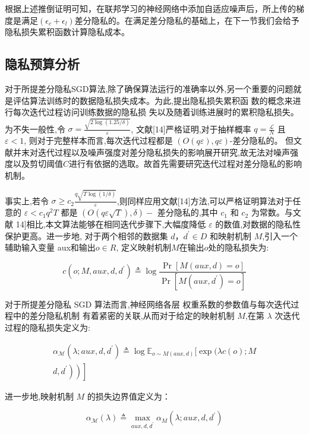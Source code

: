 根据上述推倒证明可知，在联邦学习的神经网络中添加自适应噪声后，所上传的梯度是满足$\left(\epsilon_{c}+\epsilon_{l}\right)$差分隐私的。在满足差分隐私的基础上，在下一节我们会给予隐私损失累积函数计算隐私成本。

\subsection{隐私预算分析}
对于所提差分隐私SGD算法,除了确保算法运行的准确率以外,另一个重要的问题就是评估算法训练时的数据隐私损失成本。为此,提出隐私损失累积函 数的概念来进行每次迭代过程访问训练数据的隐私损 失以及随着训练进展时的累积隐私损失。
为不失一般性,令 $\sigma=\frac{\sqrt{2 \log (1.25 / \delta)}}{\varepsilon}$, 文献[14]严格证明,对于抽样概率 $q=\frac{\mathcal{L}}{N}$ 且 $\varepsilon<1$, 则对于完整样本而言,每次迭代过程都是 $(O(q \varepsilon), q \varepsilon)$-差分隐私的。 但文献并末对迭代过程以及噪声强度对差分隐私损失的影响展开研究,故无法对噪声强度以及剪切阈值$C$进行有依据的选取。故首先需要研究迭代过程对差分隐私的影响机制。

事实上,若令 $\sigma \geqslant c_{2} \frac{q \sqrt{T \log (1 / \delta)}}{\varepsilon}$,则同样应用文献[14]方法,可以严格证明算法对于任意的 $\varepsilon<c_{1} q^{2} T$ 都是 $(O(q \varepsilon \sqrt{T}), \delta)-$ 差分隐私的,其中 $c_{1}$ 和 $c_{2}$ 为常数。与文献 14]相比,本文算法能够在相同迭代步骤下,大幅度降低 $\varepsilon$ 的数值,对数据的隐私性保护更高。进一步地, 对于两个相邻的数据集 $d$，$d^{\prime} \in D$ 和映射机制 $M$,引入一个辅助输入变量 aux和输出$o \in R$, 定义映射机制$M$在输出$o$处的隐私损失为:

$$
c\left(o ; M, a u x, d, d^{\prime}\right) \triangleq \log \frac{\operatorname{Pr}[M(a u x, d)=o]}{\operatorname{Pr}\left[M\left(a u x, d^{\prime}\right)=o\right]}
$$

对于所提差分隐私 SGD 算法而言,神经网络各层 权重系数的参数值与每次迭代过程中的差分隐私机制 有着紧密的关联,从而对于给定的映射机制 $M$,在第 $\lambda$ 次迭代过程的隐私损失定义为:

$$
\begin{array}{r}
\alpha_{\mathcal{M}}\left(\lambda ; a u x, d, d^{\prime}\right) \triangleq \log \mathbb{E}_{o \sim M(a u x, d)}[\exp (\lambda c(o) ; M \\
\left.\left.\left.d, d^{\prime}\right)\right)\right]
\end{array}
$$

进一步地,映射机制 $M$ 的损失边界值定义为：

$$\alpha_{\mathcal{M}}(\lambda) \triangleq \max _{a u x, d, d^{\prime}} \alpha_{M}\left(\lambda ; a u x, d, d^{\prime}\right)$$

